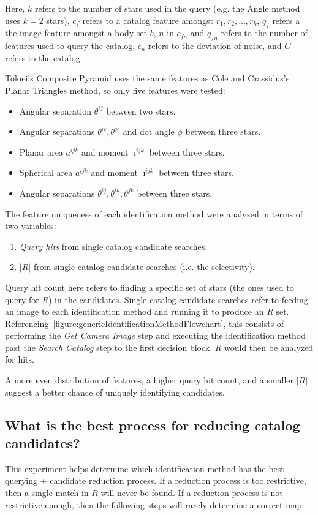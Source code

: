 Here, $k$ refers to the number of stars used in the query (e.g. the Angle method uses $k = 2$ stars), $c_f$ refers to
a catalog feature amongst $r_1, r_2, \ldots, r_k$, $q_f$ refers a the image feature amongst a body set $b$, $n$ in
$c_{fn}$ and $q_{fn}$ refers to the number of features used to query the catalog, $\epsilon_n$ refers to the deviation
of noise, and $C$ refers to the catalog.

Toloei's Composite Pyramid uses the same features as Cole and Crassidus's Planar Triangles method, so only five
features were tested:
\begin{itemize}
    \item Angular separation $\theta^{ij}$ between two stars.
    \item Angular separations $\theta^{ic}, \theta^{jc}$ and dot angle $\phi$ between three stars.
    \item Planar area $a^{ijk}$ and moment $\imath^{ijk}$ between three stars.
    \item Spherical area $a^{ijk}$ and moment $\imath^{ijk}$ between three stars.
    \item Angular separations $\theta^{ij}, \theta^{ik}, \theta^{jk}$ between three stars.
\end{itemize}

The feature uniqueness of each identification method were analyzed in terms of two variables:
\begin{enumerate}
    \item \label{itm:hitCountFeature} \textit{Query hits} from single catalog candidate searches.
    \item $|R|$ from single catalog candidate searches (i.e. the selectivity).
\end{enumerate}

Query hit count here refers to finding a specific set of stars (the ones used to query for $R$) in the candidates.
Single catalog candidate searches refer to feeding an image to each identification method and running it to produce
an $R$ set.
Referencing~\autoref{figure:genericIdentificationMethodFlowchart}, this consists of performing the \textit{Get Camera
Image} step and executing the identification method past the \textit{Search Catalog} step to the first decision
block.
$R$ would then be analyzed for hits.

A more even distribution of features, a higher query hit count, and a smaller $|R|$ suggest a better chance of uniquely
identifying candidates.

\subsection{What is the best process for reducing catalog candidates?}\label{subsec:candidateReductionMethods}
This experiment helps determine which identification method has the best querying + candidate reduction process.
If a reduction process is too restrictive, then a single match in $R$ will never be found.
If a reduction process is not restrictive enough, then the following steps will rarely determine a correct map.

